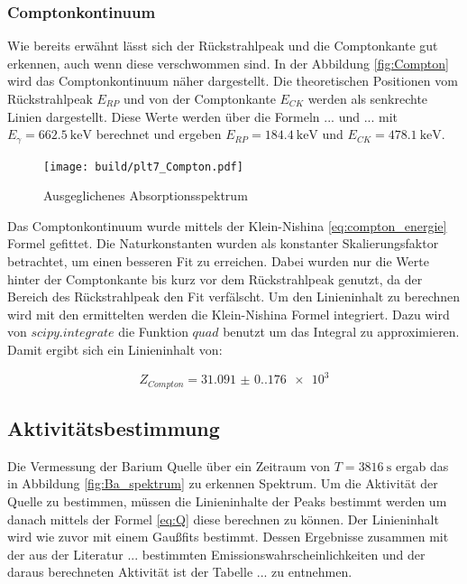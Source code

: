 \subsubsection{Comptonkontinuum}
Wie bereits erwähnt lässt sich der Rückstrahlpeak und die Comptonkante gut
erkennen, auch wenn diese verschwommen sind. In der Abbildung
\eqref{fig:Compton} wird das Comptonkontinuum näher dargestellt. Die
theoretischen Positionen vom Rückstrahlpeak $E_{RP}$ und von der Comptonkante
$E_{CK}$ werden als senkrechte Linien dargestellt. Diese Werte werden über die
Formeln ... und ... mit $E_{\gamma}=\qty{662.5}{\kilo\eV}$ berechnet und
ergeben $E_{RP}=\qty{184.4}{\kilo\eV}$ und $E_{CK}=\qty{478.1}{\kilo\eV}$.

\begin{figure}[H]
	\centering
	\texttt{[image: build/plt7\_Compton.pdf]}
	\caption{Ausgeglichenes Absorptionsspektrum}
	\label{fig:Compton}
\end{figure}

Das Comptonkontinuum wurde mittels der Klein-Nishina \eqref{eq:compton_energie} Formel gefittet.
Die Naturkonstanten wurden als konstanter Skalierungsfaktor betrachtet, um einen besseren Fit zu erreichen. 
Dabei wurden nur die Werte hinter der Comptonkante bis kurz vor dem Rückstrahlpeak genutzt, 
da der Bereich des Rückstrahlpeak den Fit verfälscht. 
Um den Linieninhalt zu berechnen wird mit den ermittelten werden die Klein-Nishina Formel integriert. 
Dazu wird von $scipy.integrate$ \cite{scipy} die Funktion $quad$ benutzt um das Integral zu approximieren. 
Damit ergibt sich ein Linieninhalt von:

\begin{equation*}
	Z_{Compton}=\num{31.091(0.176)e3}
\end{equation*}

\subsection{Aktivitätsbestimmung}
Die Vermessung der Barium Quelle über ein Zeitraum von $T=\qty{3816}{\second}$ ergab das in Abbildung \eqref{fig:Ba_spektrum} zu erkennen Spektrum. 
Um die Aktivität der Quelle zu bestimmen, müssen die Linieninhalte der Peaks bestimmt werden um danach mittels der Formel \eqref{eq:Q} diese berechnen zu können. 
Der Linieninhalt wird wie zuvor mit einem Gaußfits bestimmt. 
Dessen Ergebnisse zusammen mit der aus der Literatur ... bestimmten Emissionswahrscheinlichkeiten und der daraus berechneten Aktivität ist der Tabelle ... zu entnehmen. 

